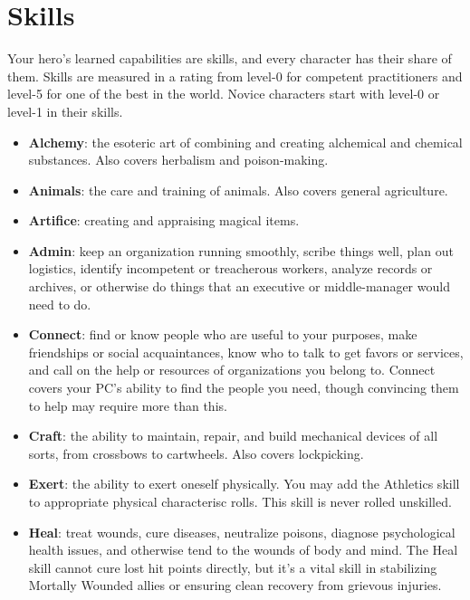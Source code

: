 \documentclass[itdr/core]{subfiles}
\begin{document}
\section{Skills} 
Your hero's learned capabilities are skills, and every character has their share of them. Skills are measured in a rating from level-0 for competent practitioners and level-5 for one of the best in the world. Novice characters start with level-0 or level-1 in their skills.

\begin{itemize}
\item \textbf{Alchemy}:  the esoteric art of combining and creating alchemical and chemical substances. Also covers herbalism and poison-making.

\item \textbf{Animals}: the care and training of animals. Also covers general agriculture.

\item \textbf{Artifice}: creating and appraising magical items.

\item \textbf{Admin}:  keep an organization running smoothly, scribe things well, plan out logistics, identify incompetent or treacherous workers, analyze records or archives, or otherwise do things that an executive or middle-manager would need to do.

\item \textbf{Connect}: find or know people who are useful to your purposes, make friendships or social acquaintances, know who to talk to get favors or services, and call on the help or resources of organizations you belong to. Connect covers your PC’s ability to find the people you need, though convincing them to help may require more than this.

\item \textbf{Craft}: the ability to maintain, repair, and build mechanical devices of all sorts, from crossbows to cartwheels. Also covers lockpicking.

\item \textbf{Exert}: the ability to exert oneself physically. You may add the Athletics skill to appropriate physical characterisc rolls. This skill is never rolled unskilled.

\item \textbf{Heal}: treat wounds, cure diseases, neutralize poisons, diagnose psychological health issues, and otherwise tend to the wounds of body and mind. The Heal skill cannot cure lost hit points directly, but it’s a vital skill in stabilizing Mortally Wounded allies or ensuring clean recovery from grievous injuries.


\end{itemize}
\end{document}
